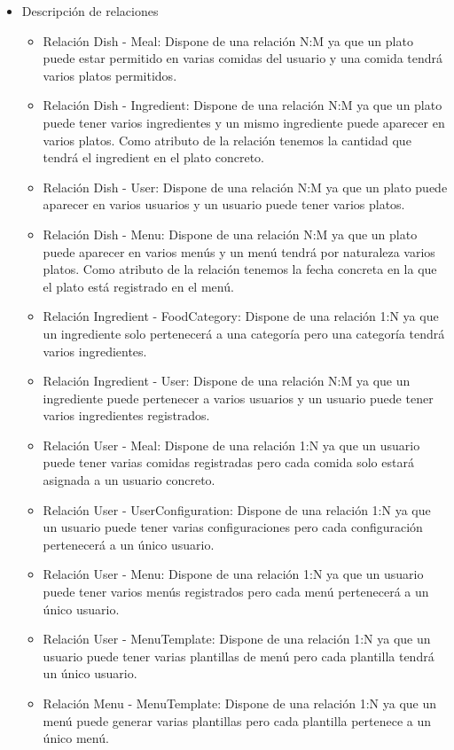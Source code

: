 \documentclass[12pt, a4paper, twoside]{book}
\begin{document}
\begin{itemize}
\begin{itemize}
		\end{itemize}
		\item Descripción de relaciones
		\begin{itemize}
			\item Relación Dish - Meal: Dispone de una relación N:M ya que un plato puede estar permitido en varias comidas del usuario y una comida tendrá varios platos permitidos.
			\item Relación Dish - Ingredient: Dispone de una relación N:M ya que un plato puede tener varios ingredientes y un mismo ingrediente puede aparecer en varios platos. Como atributo de la relación tenemos la cantidad que tendrá el ingredient en el plato concreto.
			\item Relación Dish - User: Dispone de una relación N:M ya que un plato puede aparecer en varios usuarios y un usuario puede tener varios platos.
			\item Relación Dish - Menu: Dispone de una relación N:M ya que un plato puede aparecer en varios menús y un menú tendrá por naturaleza varios platos. Como atributo de la relación tenemos la fecha concreta en la que el plato está registrado en el menú.
			\item Relación Ingredient - FoodCategory: Dispone de una relación 1:N ya que un ingrediente solo pertenecerá a una categoría pero una categoría tendrá varios ingredientes.
			\item Relación Ingredient - User: Dispone de una relación N:M ya que un ingrediente puede pertenecer a varios usuarios y un usuario puede tener varios ingredientes registrados.
			\item Relación User - Meal: Dispone de una relación 1:N ya que un usuario puede tener varias comidas registradas pero cada comida solo estará asignada a un usuario concreto.
			\item Relación User - UserConfiguration: Dispone de una relación 1:N ya que un usuario puede tener varias configuraciones pero cada configuración pertenecerá a un único usuario.
			\item Relación User - Menu: Dispone de una relación 1:N ya que un usuario puede tener varios menús registrados pero cada menú pertenecerá a un único usuario.
			\item Relación User - MenuTemplate: Dispone de una relación 1:N ya que un usuario puede tener varias plantillas de menú pero cada plantilla tendrá un único usuario.
			\item Relación Menu - MenuTemplate: Dispone de una relación 1:N ya que un menú puede generar varias plantillas pero cada plantilla pertenece a un único menú.
		\end{itemize}
	\end{itemize}	
\end{document}
